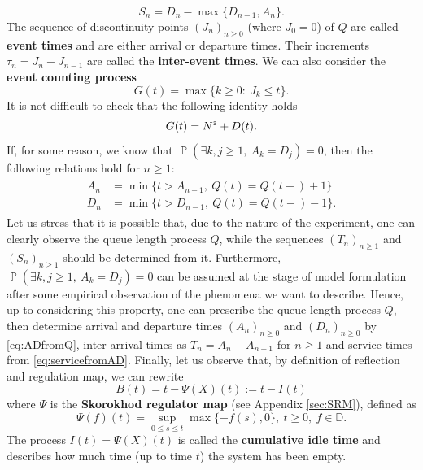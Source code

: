 \documentclass[]{amsart}
\numberwithin{equation}{section}
\theoremstyle{remark}
\theoremstyle{definition}
\DeclareMathOperator{\bP}{\mathbb{P}}
\begin{document}
\begin{equation}\label{eq:servicefromAD}
	S_n=D_n-\max\{D_{n-1},A_n\}.
\end{equation}
The sequence of discontinuity points $(J_n)_{n \ge 0}$ (where $J_0=0$) of $Q$ are called \textbf{event times} and are either arrival or departure times. Their increments $\tau_n=J_n-J_{n-1}$ are called the \textbf{inter-event times}. {We can also consider the \textbf{event counting process}
\begin{equation*}
	G(t)=\max\{k \ge 0: \ J_k \le t\}.
\end{equation*}
It is not difficult to check that the following identity holds
\begin{equation*}
	G(t)=N^{\sf a}+D(t).
\end{equation*}}
If, for some reason, we know that $\bP(\exists k,j \ge 1, \ A_k=D_j)=0$, then the following relations hold for $n \ge 1$:
\begin{align}\label{eq:ADfromQ}
	\begin{split}
		A_n&=\min\{t>A_{n-1}, \ Q(t)=Q(t-)+1\}\\
		D_n&=\min\{t>D_{n-1}, \ Q(t)=Q(t-)-1\}.	
	\end{split}
\end{align}
Let us stress that it is possible that, due to the nature of the experiment, one can clearly observe the queue length process $Q$, while the sequences $(T_n)_{n \ge 1}$ and $(S_n)_{n \ge 1}$ should be determined from it. Furthermore, $\bP(\exists k,j \ge 1, \ A_k=D_j)=0$ can be assumed at the stage of model formulation after some empirical observation of the phenomena we want to describe. Hence, up to considering this property, one can prescribe the queue length process $Q$, then determine arrival and departure times $(A_n)_{n \ge 0}$ and $(D_n)_{n \ge 0}$ by \eqref{eq:ADfromQ}, inter-arrival times as $T_n=A_n-A_{n-1}$ for $n \ge 1$ and service times from \eqref{eq:servicefromAD}. Finally, let us observe that, by definition of reflection and regulation map, we can rewrite
\begin{equation*}
	B(t)=t-\Psi(X)(t):=t-I(t)
\end{equation*}
{where $\Psi$ is the \textbf{Skorokhod regulator map} (see Appendix \ref{sec:SRM}), defined as \begin{equation*}
	\Psi(f)(t)=\sup_{0 \le s \le t}\max\{-f(s),0\}, \ t \ge 0, \ f \in \mathbb{D}.
\end{equation*}
The process} $I(t)=\Psi(X)(t)$ is called the \textbf{cumulative idle time} and describes how much time (up to time $t$) the system has been empty.
\end{document}

